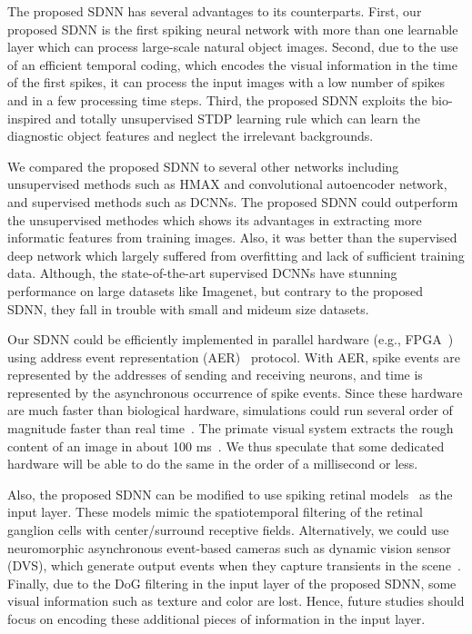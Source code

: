 \documentclass[preprint,5p,12pt,twocolumn]{article}
\begin{document}
The proposed SDNN has several advantages to its counterparts. First, our proposed SDNN is the first spiking neural network with more than one learnable layer which can process large-scale natural object images. Second, due to the use of an efficient temporal coding, which encodes the visual information in the time of the first spikes, it can process the input images with a low number of spikes and in a few processing time steps. Third, the proposed SDNN exploits the bio-inspired and totally unsupervised STDP learning rule which can learn the diagnostic object features and neglect the irrelevant backgrounds.

We compared the proposed SDNN to several other networks including unsupervised methods such as HMAX and convolutional autoencoder network, and supervised methods such as DCNNs. The proposed SDNN could outperform the unsupervised methodes which shows its advantages in extracting more informatic features from training images. Also, it was better than the supervised deep network which largely suffered from overfitting and lack of sufficient training data. Although, the state-of-the-art supervised DCNNs have stunning performance on large datasets like Imagenet, but contrary to the proposed SDNN, they fall in trouble with small and mideum size datasets.

Our SDNN could be efficiently implemented in parallel hardware (e.g., FPGA~\cite{Yousefzadeh2015}) using address event representation (AER)~\cite{Sivilotti1991} protocol. With AER, spike events are represented by the addresses of sending and receiving neurons, and time is represented by the asynchronous occurrence of spike events. Since these hardware are much faster than biological hardware, simulations could run several order of magnitude faster than real time~\cite{Serrano-Gotarredona2013}. The primate visual system extracts the rough content of an image in about 100 ms~\cite{thorpe1996speed,hung2005fast,Kirchner2006,liu2009timing}. We thus speculate that some dedicated hardware will be able to do the same in the order of a millisecond or less.

Also, the proposed SDNN can be modified to use spiking retinal models~\cite{Wohrer2009,Martinez-Canada2016} as the input layer. These models mimic the spatiotemporal filtering  of the retinal ganglion cells with center/surround receptive fields. Alternatively, we could use neuromorphic asynchronous event-based cameras such as dynamic vision sensor (DVS), which generate output events when they capture transients in the scene~\cite{Lichtsteiner2007}. Finally, due to the DoG filtering in the input layer of the proposed SDNN, some visual information such as texture and color are lost. Hence, future studies should focus on encoding these additional pieces of information in the input layer.
\end{document}
